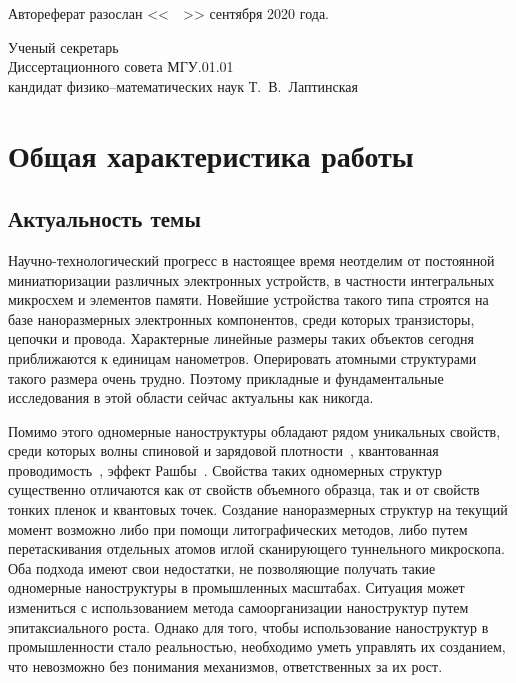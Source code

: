 \documentclass[10pt]{book}
\begin{document}
Автореферат разослан <<~\underline{\hspace*{0.7cm}}~>> сентября 2020 года.
\vfill

Ученый секретарь \\
Диссертационного совета МГУ.01.01 \\
кандидат физико--математических наук \hfill Т.~В.~Лаптинская



\setlength{\parindent}{1em} \onehalfspacing
\newpage

\chapter{Общая характеристика работы}

\section{Актуальность темы}
Научно-технологический прогресс в настоящее время неотделим от постоянной миниатюризации различных электронных устройств, в частности интегральных микросхем и элементов памяти.
Новейшие устройства такого типа строятся на базе наноразмерных электронных компонентов, среди которых транзисторы, цепочки и провода. 
Характерные линейные размеры таких объектов сегодня приближаются к единицам нанометров. Оперировать атомными структурами такого размера очень трудно.
Поэтому прикладные и фундаментальные исследования в этой области сейчас актуальны как никогда.

Помимо этого одномерные наноструктуры обладают рядом уникальных свойств, среди которых волны спиновой и зарядовой плотности~\cite{Erwin2010}, квантованная проводимость~\cite{Klavsyuk2015}, эффект Рашбы~\cite{Rasba84.1}.
Свойства таких одномерных структур существенно отличаются как от свойств объемного образца, так и от свойств тонких пленок и квантовых точек.
Создание наноразмерных структур на текущий момент возможно либо при помощи литографических методов, либо путем перетаскивания отдельных атомов иглой сканирующего туннельного микроскопа.
Оба подхода имеют свои недостатки, не позволяющие получать такие одномерные наноструктуры в промышленных масштабах.
Ситуация может измениться с использованием метода самоорганизации наноструктур путем эпитаксиального роста.
Однако для того, чтобы использование наноструктур в промышленности стало реальностью, необходимо уметь управлять их созданием, что невозможно без понимания механизмов, ответственных за их рост.
\end{document}
